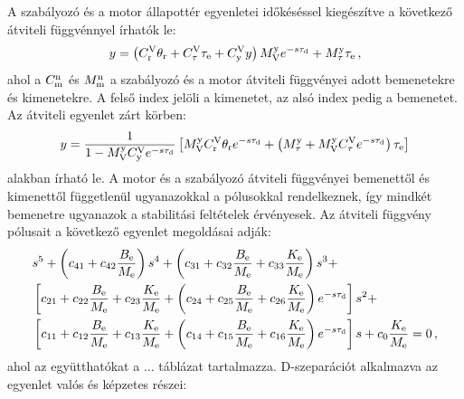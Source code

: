 A szabályozó és a motor állapottér egyenletei időkéséssel kiegészítve a következő átviteli 
függvénnyel írhatók le:
\begin{align}
    \begin{split}
        y = \left(C^{\mathrm{V}}_{\mathrm{r}} \theta_{\mathrm{r}} + 
        C^{\mathrm{V}}_{\mathrm{\tau}} \tau_{\mathrm{e}} +
        C^{\mathrm{V}}_{\mathrm{y}} y\right)M^{\mathrm{y}}_{\mathrm{V}} e^{-s\tau_{\mathrm{d}}} +
        M^{\mathrm{y}}_{\mathrm{\tau}} \tau_{\mathrm{e}}\,,
    \end{split}
\end{align}
ahol a \(C^{\mathrm{n}}_{\mathrm{m}}\) és \(M^{\mathrm{n}}_{\mathrm{m}}\) a szabályozó és a motor átviteli függvényei adott 
bemenetekre és kimenetekre. A felső index jelöli a kimenetet, az alsó index pedig a bemenetet.
Az átviteli egyenlet zárt körben:
\begin{align}
    \begin{split}
        y = \frac{1}{1 - M^{\mathrm{y}}_{\mathrm{V}} C^{\mathrm{V}}_{\mathrm{y}} e^{-s\tau_{\mathrm{d}}}}
        \left[
            M^{\mathrm{y}}_{\mathrm{V}} C^{\mathrm{V}}_{\mathrm{r}} \theta_{\mathrm{r}} e^{-s\tau_{\mathrm{d}}} + 
            \left(M^{\mathrm{y}}_{\mathrm{\tau}} + M^{\mathrm{y}}_{\mathrm{V}} C^{\mathrm{V}}_{\mathrm{\tau}} e^{-s\tau_{\mathrm{d}}}\right) \tau_{\mathrm{e}}
        \right]
    \end{split}
\end{align}
alakban írható le. A motor és a szabályozó átviteli függvényei bemenettől és kimenettől 
függetlenül ugyanazokkal a pólusokkal rendelkeznek, így mindkét bemenetre ugyanazok a stabilitási 
feltételek érvényesek. Az átviteli függvény pólusait a következő egyenlet megoldásai adják:
\begin{align}\label{eq:delay_characteristic}
    \begin{split}
        &s^5 + 
        \left(c_{41} + c_{42}\frac{B_{\mathrm{e}}}{M_{\mathrm{e}}}\right)s^4 +
        \left(c_{31} + c_{32}\frac{B_{\mathrm{e}}}{M_{\mathrm{e}}} + c_{33}\frac{K_{\mathrm{e}}}{M_{\mathrm{e}}}\right)s^3 + \\
        &\left[c_{21} + c_{22}\frac{B_{\mathrm{e}}}{M_{\mathrm{e}}} + c_{23}\frac{K_{\mathrm{e}}}{M_{\mathrm{e}}} + \left(
        c_{24} + c_{25}\frac{B_{\mathrm{e}}}{M_{\mathrm{e}}} + c_{26}\frac{K_{\mathrm{e}}}{M_{\mathrm{e}}}\right)e^{-s\tau_{\mathrm{d}}}\right]s^2 + \\
        &\left[c_{11} + c_{12}\frac{B_{\mathrm{e}}}{M_{\mathrm{e}}} + c_{13}\frac{K_{\mathrm{e}}}{M_{\mathrm{e}}} + \left(
        c_{14} + c_{15}\frac{B_{\mathrm{e}}}{M_{\mathrm{e}}} + c_{16}\frac{K_{\mathrm{e}}}{M_{\mathrm{e}}}\right)e^{-s\tau_{\mathrm{d}}}\right]s + 
        c_0 \frac{K_{\mathrm{e}}}{M_{\mathrm{e}}} = 0\,,
    \end{split}
\end{align}
ahol az együtthatókat a ... táblázat tartalmazza. D-szeparációt alkalmazva az egyenlet valós és 
képzetes részei:

